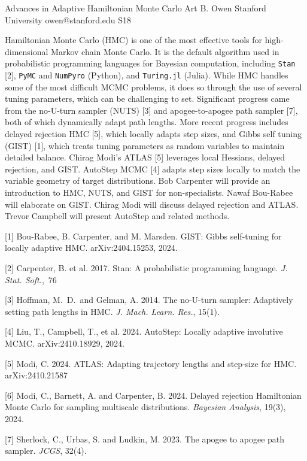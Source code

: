 \documentclass[12pt,lettersize,oneside]{book} %
\begin{document}
\begin{session}
 {Advances in Adaptive Hamiltonian Monte Carlo}%
 {Art B. Owen}%
 {Stanford University}%
 {owen@stanford.edu}%
{}{}{}
 {S18}%
{}

 Hamiltonian Monte Carlo (HMC) is one of the most effective tools for high-dimensional Markov chain Monte Carlo. It is the default algorithm used in probabilistic programming languages for Bayesian computation, including \texttt{Stan} [2], \texttt{PyMC} and \texttt{NumPyro} (Python), and \texttt{Turing.jl} (Julia).  While HMC handles some of the most difficult MCMC problems, it does so through the use of several tuning parameters, which can be challenging to set.
 Significant progress came from the no-U-turn sampler (NUTS) [3] and apogee-to-apogee path sampler [7], both of which dynamically adapt path lengths. More recent progress includes delayed rejection HMC [5], which locally adapts step sizes, and
 Gibbs self tuning (GIST) [1], which treats tuning parameters as random variables to maintain detailed balance.  Chirag Modi's ATLAS [5] leverages local Hessians, delayed rejection, and GIST.  AutoStep MCMC [4] adapts step sizes locally to match the variable geometry of target distributions.
 Bob Carpenter will provide an introduction to HMC, NUTS, and GIST for non-specialists. Nawaf Bou-Rabee will elaborate on GIST. Chirag Modi will discuss delayed rejection and ATLAS. Trevor Campbell will present AutoStep and related methods.
 \medskip
 \begin{description}
 \item{[1]} Bou-Rabee, B. Carpenter, and M. Marsden. GIST: Gibbs self-tuning for locally adaptive HMC. arXiv:2404.15253, 2024.
 \item{[2]} Carpenter, B. et al. 2017. Stan: A probabilistic programming language. \textit{J. Stat. Soft.},~76
 \item{[3]} Hoffman, M.~D.\ and Gelman, A. 2014. The no-U-turn sampler: Adaptively setting path lengths in HMC. \textit{J. Mach. Learn. Res.}, 15(1).
 \item{[4]} Liu, T., Campbell, T., et al. 2024. AutoStep: Locally adaptive involutive MCMC. arXiv:2410.18929, 2024.
 \item{[5]} Modi, C. 2024. ATLAS: Adapting trajectory lengths and step-size for HMC. arXiv:2410.21587
 \item{[6]} Modi, C., Barnett, A. and Carpenter, B. 2024. Delayed rejection Hamiltonian Monte Carlo for sampling multiscale distributions. \textit{Bayesian Analysis}, 19(3), 2024.
 \item{[7]} Sherlock, C., Urbas, S. and Ludkin, M. 2023. The apogee to apogee path sampler. \textit{JCGS}, 32(4).
 \end{description}
\end{session}
\end{document}

